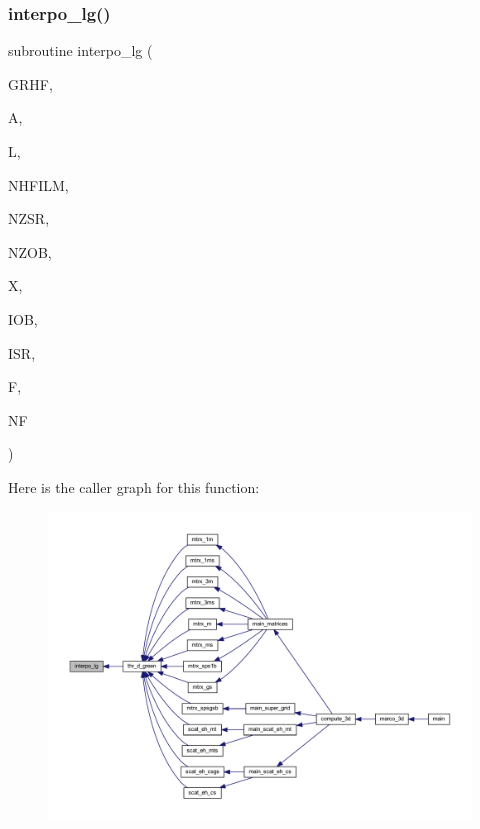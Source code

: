 \subsubsection{\texorpdfstring{interpo\+\_\+lg()}{interpo\_lg()}}
{\footnotesize\ttfamily subroutine interpo\+\_\+lg (\begin{DoxyParamCaption}\item[{complex, dimension(11,nhfilm,nzsr,nzob)}]{G\+R\+HF,  }\item[{real, dimension(l)}]{A,  }\item[{integer}]{L,  }\item[{integer}]{N\+H\+F\+I\+LM,  }\item[{integer}]{N\+Z\+SR,  }\item[{integer}]{N\+Z\+OB,  }\item[{real}]{X,  }\item[{integer}]{I\+OB,  }\item[{integer}]{I\+SR,  }\item[{complex, dimension(nf)}]{F,  }\item[{integer}]{NF }\end{DoxyParamCaption})}

Here is the caller graph for this function\+:
\nopagebreak
\begin{figure}[H]
\begin{center}
\leavevmode
\includegraphics[width=350pt]{Marco_8f90_ab4eafb4c3c596148d85f446d1eb69d54_icgraph}
\end{center}
\end{figure}
\mbox{\label{Marco_8f90_a3fe5c8bfe5e5729f1b02af3926c68dbc}} 
